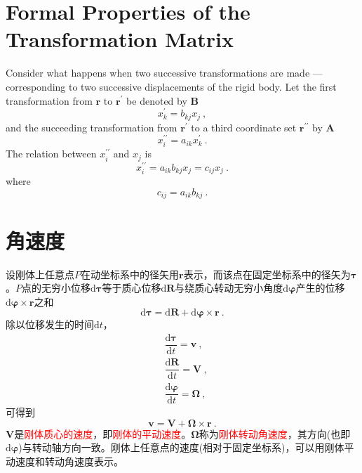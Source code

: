 \documentclass[12pt,a4paper]{article}
\renewcommand{\vec}[1]{\boldsymbol{#1}}
\newcommand{\dif}{\mathrm{d}}
\begin{document}
\section{Formal Properties of the Transformation Matrix}
\cite{goldstein2011classical} Consider what happens when two successive transformations are made — corresponding to two successive displacements of the rigid body. Let the first transformation from $\vec{r}$ to $\vec{r}^\prime$ be denoted by $\vec{B}$
\begin{equation}
x^\prime_k = b_{kj} x_j ~,
\end{equation}
and the succeeding transformation from $\vec{r}^\prime$ to a third coordinate set $\vec{r}^{\prime \prime} $ by $\vec{A}$
\begin{equation}
x^{\prime\prime}_i = a_{ik} x^\prime_k ~.
\end{equation}
The relation between $x^{\prime\prime}_i$ and $x_j$ is
\begin{equation*}
x^{\prime\prime}_i = a_{ik} b_{kj} x_j = c_{ij} x_j ~.
\end{equation*}
where
\begin{equation}
c_{ij} = a_{ik} b_{kj} ~.
\end{equation}



\section{角速度}


\cite{2007理论物理学教程} 设刚体上任意点$P$在动坐标系中的径矢用$\vec{r}$表示，而该点在固定坐标系中的径矢为$\vec{\tau}$。$P$点的无穷小位移$\dif \vec{\tau}$等于质心位移$\dif \vec{R}$与绕质心转动无穷小角度$\dif \vec{\varphi}$产生的位移$\dif \vec{\varphi} \times \vec{r}$之和
\begin{equation*}
\dif \vec{\tau} = \dif \vec{R} +\dif \vec{\varphi} \times \vec{r} ~.
\end{equation*}
除以位移发生的时间$\dif t$，
\begin{align*}
& \dfrac{\dif \vec{\tau} }{\dif t} = \vec{v} ~, \\
& \dfrac{\dif \vec{R} }{\dif t} = \vec{V} ~, \\
& \dfrac{\dif \vec{\varphi} }{\dif t} = \vec{\Omega} ~, 
\end{align*}
可得到
\begin{equation}
\vec{v} = \vec{V} + \vec{\Omega} \times \vec{r} ~.
\end{equation}
$\vec{V}$是\textcolor{red}{刚体质心的速度}，即\textcolor{red}{刚体的平动速度}。$\vec{\Omega}$称为\textcolor{red}{刚体转动角速度}，其方向(也即$\dif \vec{\varphi}$)与转动轴方向一致。刚体上任意点的速度(相对于固定坐标系)，可以用刚体平动速度和转动角速度表示。
\end{document}
